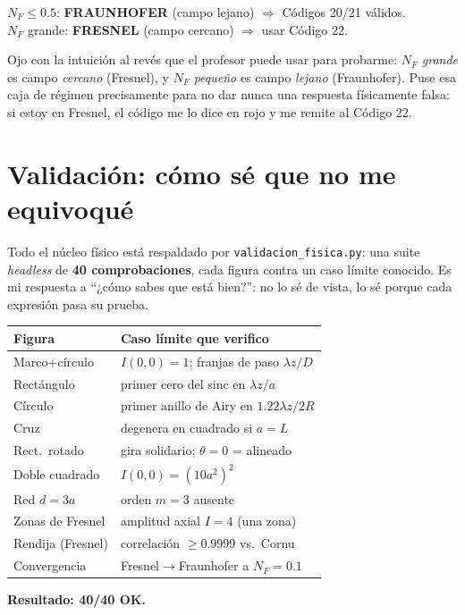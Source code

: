 \documentclass[11pt,a4paper]{article}
\begin{document}
\begin{mdframed}[linecolor=verde,linewidth=1pt,backgroundcolor=grispanel]
\centering
$N_F\le 0.5$: \textcolor{verde}{\textbf{FRAUNHOFER}} (campo lejano) $\Rightarrow$ Códigos 20/21 válidos.\\
$N_F$ grande: \textcolor{rojo}{\textbf{FRESNEL}} (campo cercano) $\Rightarrow$ usar Código 22.
\end{mdframed}

\begin{decir}
Ojo con la intuición al revés que el profesor puede usar para probarme:
$N_F$ \emph{grande} es campo \emph{cercano} (Fresnel), y $N_F$ \emph{pequeño} es
campo \emph{lejano} (Fraunhofer). Puse esa caja de régimen precisamente para no dar
nunca una respuesta físicamente falsa: si estoy en Fresnel, el código me lo dice en
rojo y me remite al Código 22.
\end{decir}

\section{Validación: cómo sé que no me equivoqué}
\label{sec:validacion}

Todo el núcleo físico está respaldado por \texttt{validacion\_fisica.py}: una suite
\emph{headless} de \textbf{40 comprobaciones}, cada figura contra un caso límite
conocido. Es mi respuesta a ``¿cómo sabes que está bien?'': no lo sé de vista, lo
sé porque cada expresión pasa su prueba.

\begin{center}
\begin{tabular}{@{}ll@{}}
\toprule
\textbf{Figura} & \textbf{Caso límite que verifico} \\
\midrule
Marco+círculo & $I(0,0)=1$; franjas de paso $\lambda z/D$ \\
Rectángulo & primer cero del sinc en $\lambda z/a$ \\
Círculo & primer anillo de Airy en $1.22\lambda z/2R$ \\
Cruz & degenera en cuadrado si $a=L$ \\
Rect.\ rotado & gira solidario; $\theta=0$ = alineado \\
Doble cuadrado & $I(0,0)=(10a^2)^2$ \\
Red $d=3a$ & orden $m=3$ ausente \\
Zonas de Fresnel & amplitud axial $I=4$ (una zona) \\
Rendija (Fresnel) & correlación $\ge0.9999$ vs.\ Cornu \\
Convergencia & Fresnel$\to$Fraunhofer a $N_F=0.1$ \\
\bottomrule
\end{tabular}
\end{center}
\textbf{Resultado: 40/40 OK.}
\end{document}
